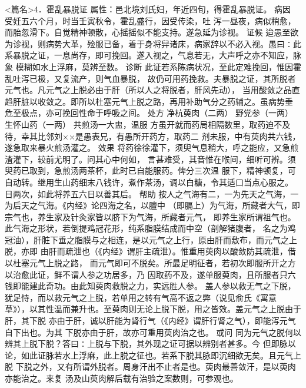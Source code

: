 \documentclass[a4paper,12pt,UTF8,twoside]{ctexbook}
\begin{document}
<篇名>4．霍乱暴脱证
属性：邑北境刘氏妇，年近四旬，得霍乱暴脱证。 
病因 受妊五六个月，时当壬寅秋令，霍乱盛行，因受传染，吐 
泻一昼夜，病似稍愈，而胎忽滑下。自觉精神顿散，心摇摇似不能支持。遂急延为诊视。 
证候 迨愚至欲为诊视，则病势大革，殓服已备，着于身将舁诸床，病家辞以不必入视。愚曰∶此 
系暴脱之证，一息尚存，即可挽回。遂入视之，气息若无，大声呼之亦不知应，脉象 
模糊如水上浮麻，莫辨至数。 
诊断 此证若系陈病状况，至此定难挽回，惟因霍乱吐泻已极，又复流产，则气血暴脱， 
故仍可用药挽救。夫暴脱之证，其所脱者元气也。凡元气之上脱必由于肝（所以人之将脱者，肝风先动）， 
当用酸敛之品直趋肝脏以收敛之。即所以杜塞元气上脱之路，再用补助气分之药辅之。虽病势垂 
危至极点，亦可挽回性命于呼吸之间。 
处方 净杭萸肉（二两） 野党参（一两） 生怀山药（一两） 
共煎汤一大盅，温服 
方虽开就而药局相隔数里，取药迫不及待，幸其比邻刘××是愚表兄，有愚所开药方，取药二 
剂未服，中有萸肉共六钱，遂急取来暴火煎汤灌之。 
效果 将药徐徐灌下，须臾气息稍大，呼之能应，又急煎渣灌下，较前尤明了。问其心中何如， 
言甚难受，其音惟在喉间，细听可辨。须臾药已取到，急煎汤两茶杯，此时已自能服药。俾分三次温 
服下，精神顿复，可自动转。继用生山药细末八钱许，煮作茶汤，调以白糖，令其适口当点心服之。 
日两次，如此将养五六日以善其后。 
帮助 按人之气海有二，一为先天之气海，一为后天之气海。《内经》论四海之名，以膻中 
（即膈上）为气海，所藏者大气，即宗气也，养生家及针灸家皆以脐下为气海，所藏者元气， 
即养生家所谓祖气也。此气海之形状，若倒提鸡冠花形，纯系脂膜结成而中空（剖解猪腹者， 
名之为鸡冠油），肝脏下垂之脂膜与之相连，是以元气之上行，原由肝而敷布，而元气之上脱，亦即 
由肝而疏泄也（《内经》谓肝主疏泄）。惟重用萸肉以酸敛防其疏泄，借以杜塞元气上脱之路， 
而元气即可不脱矣。所最足明征者，若初次即服所开之方以治愈此证，鲜不谓人参之功居多，乃 
因取药不及，遂单服萸肉，且所服者只六钱即能建此奇功。由此知萸肉救脱之力，实远胜人参。 
盖人参以救无气之下脱，犹足恃，而以救元气之上脱，若单用之转有气高不返之弊（说见俞氏《寓意 
草》），以其性温而兼升也。至萸肉则无论上脱下脱，用之皆效。盖元气之上脱由于肝，其下脱 
亦由于肝，诚以肝能为肾行气（《内经》谓肝行肾之气），即能泻元气自下出也。为其 
下脱亦由于肝，故亦可重用萸肉治之也。 
或问 同为元气之脱何以辨其上脱下脱？答曰∶上脱与下脱，其外现之证可据以辨别者甚多。今 
但即脉以论，如此证脉若水上浮麻，此上脱之征也。若系下脱其脉即沉细欲无矣。且元气上脱 
下脱之外，又有所谓外脱者。周身汗出不止者是也。萸肉最善敛汗，是以萸肉亦能治之。来复 
汤及山萸肉解后载有治验之案数则，可参观也。 
\end{document}
